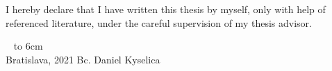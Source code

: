 {~}\vspace{12cm}

\thispagestyle{empty}
\noindent
\begin{minipage}{0.25\textwidth}~\end{minipage}
\begin{minipage}{0.75\textwidth}
I hereby declare that I have written this thesis by myself, only with help of referenced literature, under the careful supervision of my thesis advisor.
\end{minipage}
\vfill
~ \hfill {\hbox to 6cm{\dotfill}} \\
Bratislava, 2021 \hfill Bc. Daniel Kyselica
\vfill\eject 